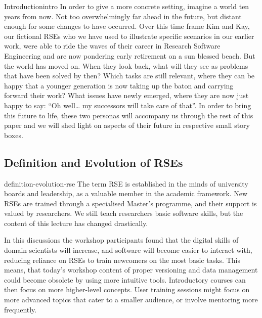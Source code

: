 \documentclass{eceasst}
\begin{document}
\begin{story}{Introduction}{intro}
In order to give a more concrete setting, imagine a world ten years from now.
Not too overwhelmingly far ahead in the future, but distant enough for some changes to have occurred.
Over this time frame Kim\cite{Anzt2021} and Kay\cite{Goth2024},
our fictional RSEs who we have used to illustrate specific scenarios in our earlier work,
were able to ride the waves of their career in Research Software Engineering and are now pondering early retirement on a sun blessed beach.
But the world has moved on.
When they look back, what will they see as problems that have been solved by then?
Which tasks are still relevant, where they can be happy that a younger generation is now taking up the baton and carrying forward their work?
What issues have newly emerged, where they are now just happy to say: “Oh well… my successors will take care of that”.
In order to bring this future to life, these two personas will accompany us through the rest of this paper and we will shed light on aspects
of their future in respective small story boxes.
\end{story}

\subsection{Definition and Evolution of RSEs}
\begin{whatis}{}{definition-evolution-rse}
The term RSE is established in the minds of university boards and leadership, as a valuable member in the academic framework.
New RSEs are trained through a specialised Master's programme, and their support is valued by researchers. We still teach researchers basic software skills, but the content of this lecture has changed drastically.
\end{whatis}
In this discussions the workshop participants found that
the digital skills of domain scientists will increase,
and software will become easier to interact with,
reducing reliance on RSEs to train newcomers on the most basic tasks.
This means, that today's workshop content of proper versioning and data management could become obsolete
by using more intuitive tools.
Introductory courses can then focus on more higher-level concepts.
User training sessions might focus on more advanced topics
that cater to a smaller audience, or involve mentoring more frequently.
\end{document}
